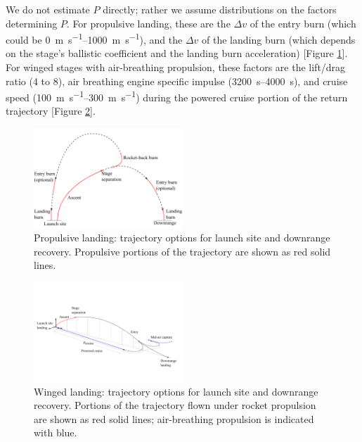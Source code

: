 \documentclass[conf]{new-aiaa}
\begin{document}
\begin{multicols}{2}
We do not estimate $P$ directly; rather we assume distributions on the factors determining $P$. For propulsive landing, these are the $\Delta v$ of the entry burn (which could be \SIrange{0}{1000}{\meter\per\second}), and the $\Delta v$ of the landing burn (which depends on the stage's ballistic coefficient and the landing burn acceleration) [Figure \ref{fig:propulsive_landing}]. For winged stages with air-breathing propulsion, these factors are the lift/drag ratio (4 to 8), air breathing engine specific impulse (\SIrange{3200}{4000}{\second}), and cruise speed (\SIrange{100}{300}{\meter\per\second}) during the powered cruise portion of the return trajectory [Figure \ref{fig:flyback_trajectory}].

\begin{figure}[H]
    \centering
    \includegraphics[width=0.5\textwidth]{propulsive_landing}
    \caption{\label{fig:propulsive_landing} Propulsive landing: trajectory options for launch site and downrange recovery. Propulsive portions of the trajectory are shown as red solid lines.}
\end{figure}

\begin{figure}[H]
    \centering
    \includegraphics[width=0.5\textwidth]{flyback_trajectory}
    \caption{\label{fig:flyback_trajectory} Winged landing: trajectory options for launch site and downrange recovery. Portions of the trajectory flown under rocket propulsion are shown as red solid lines; air-breathing propulsion is indicated with blue.}
\end{figure}


\end{multicols}
\end{document}
